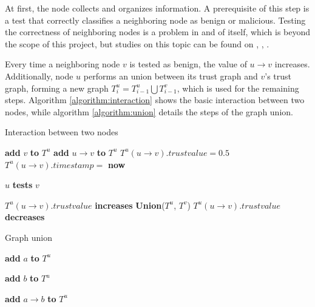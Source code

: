 At first, the node collects and organizes information.
A prerequisite of this step is a test that correctly classifies a neighboring node as benign or malicious.
Testing the correctness of neighboring nodes is a problem in and of itself, which is beyond the scope of this project, but studies on this topic can be found on \citep{golle2004detecting}, \citep{kerrache2016detection}, \citep{li2016defective}.

Every time a neighboring node $v$ is tested as benign, the value of $u \rightarrow v$ increases.
Additionally, node $u$ performs an union between its trust graph and $v$'s trust graph, forming a new graph $T^u_i = T^u_{i-1} \bigcup T^v_{i-1}$, which is used for the remaining steps.
Algorithm  \autoref{algorithm:interaction} shows the basic interaction between two nodes, while algorithm \autoref{algorithm:union} details the steps of the graph union.

\begin{algorithm}
\caption{Interaction between two nodes}\label{algorithm:interaction}
\begin{algorithmic}[1]


	\State \textbf{add} $v$ \textbf{to} $T^u$
	\State \textbf{add} $u\rightarrow v$ \textbf{to} $T^u$
	\State $T^u(u\rightarrow v).trustvalue = 0.5$
	\State $T^u(u\rightarrow v).timestamp = $ \textbf{now}
\EndIf

\State $u$ \textbf{tests} $v$

	\State $T^u(u\rightarrow v).trustvalue$ \textbf{increases}
	\State \textbf{Union}($T^u$, $T^v$)
\Else
	\State $T^u(u\rightarrow v).trustvalue$ \textbf{decreases}
\EndIf


\EndFunction
\end{algorithmic}
\end{algorithm}

\begin{algorithm}
\caption{Graph union}\label{algorithm:union}
\begin{algorithmic}[1]



		\State \textbf{add} $a$ \textbf{to} $T^u$
	\EndIf
	
		\State \textbf{add} $b$ \textbf{to} $T^u$
	\EndIf
	
		\State \textbf{add} $a\rightarrow b$ \textbf{to} $T^u$
	\EndIf
\EndFor

\EndFunction
\end{algorithmic}
\end{algorithm}

